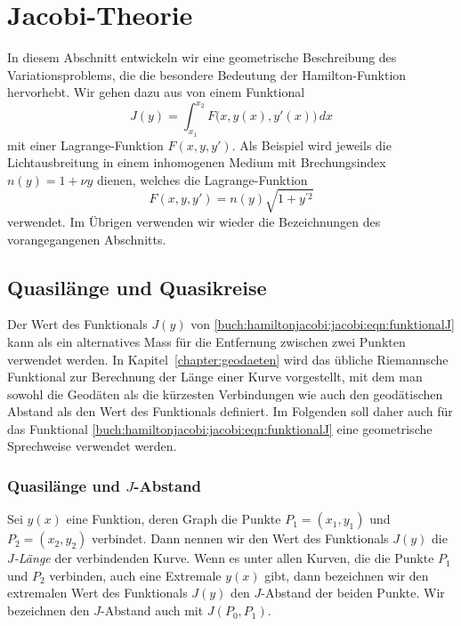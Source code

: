 %
%
%
\section{Jacobi-Theorie
\label{buch:hamiltonjacobi:section:jacobi}}

In diesem Abschnitt entwickeln wir eine geometrische Beschreibung des
Variationsproblems, die die besondere Bedeutung der Hamilton-Funktion
hervorhebt.
Wir gehen dazu aus von einem Funktional
\begin{equation}
J(y)
=
\int_{x_1}^{x_2}
F\bigl(x,y(x),y'(x)\bigr)
\,dx
\label{buch:hamiltonjacobi:jacobi:eqn:funktionalJ}
\end{equation}
mit einer Lagrange-Funktion $F(x,y,y')$.
Als Beispiel wird jeweils die Lichtausbreitung in einem inhomogenen
Medium mit Brechungsindex $n(y) = 1+\nu y$ dienen, welches die
Lagrange-Funktion
\begin{equation}
F(x,y,y')
=
n(y) \sqrt{1+y^{\prime 2}}
\label{buch:hamiltonjacobi:jacobi:eqn:beispielF}
\end{equation}
verwendet.
Im Übrigen verwenden wir wieder die Bezeichnungen des vorangegangenen
Abschnitts.

%
%
\subsection{Quasilänge und Quasikreise
\label{buch:hamiltonjacobi:jacobi:subsection:quasi}}
Der Wert des Funktionals $J(y)$ von
\eqref{buch:hamiltonjacobi:jacobi:eqn:funktionalJ}
kann als ein alternatives Mass für die Entfernung zwischen
zwei Punkten verwendet werden.
In Kapitel~\ref{chapter:geodaeten} wird das übliche Riemannsche
Funktional zur Berechnung der Länge einer Kurve vorgestellt, mit dem
man sowohl die Geodäten als die kürzesten Verbindungen wie auch
den geodätischen Abstand als den Wert des Funktionals definiert.
Im Folgenden soll daher auch für das Funktional 
\eqref{buch:hamiltonjacobi:jacobi:eqn:funktionalJ}
eine geometrische Sprechweise verwendet werden.

%
%
\subsubsection{Quasilänge und $J$-Abstand}
Sei $y(x)$ eine Funktion, deren Graph die Punkte $P_1=(x_1,y_1)$
und $P_2=(x_2,y_2)$ verbindet.
Dann nennen wir den Wert des Funktionals $J(y)$ die {\em $J$-Länge}
%
der verbindenden Kurve.
Wenn es unter allen Kurven, die die Punkte $P_1$  und $P_2$ verbinden,
auch eine Extremale $y(x)$ gibt, dann bezeichnen wir den extremalen
Wert des Funktionals $J(y)$ den $J$-Abstand der beiden Punkte.
Wir bezeichnen den $J$-Abstand auch mit $J(P_0,P_1)$.

